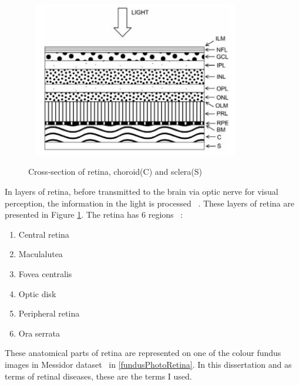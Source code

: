 \begin{figure}[t]
\caption{Cross-section of retina, choroid(C) and sclera(S)}~\cite{falt2012modern}
\label{layersOfRetina}
\centering
\includegraphics[width=0.8\textwidth]{Figures/layers_of_retina}
\end{figure}


In layers of retina, before transmitted to the brain via optic nerve for visual perception, the information in the light is processed ~\cite{kauppi2010eye}. These layers of retina are presented in Figure \ref{layersOfRetina}. The retina has 6 regions ~\cite{forrester2015eye}:

\begin{enumerate}
    \item Central retina
    \item Maculalutea
    \item Fovea centralis
    \item Optic disk
    \item Peripheral retina
    \item Ora serrata
\end{enumerate}

These anatomical parts of retina are represented on one of the colour fundus images in Messidor dataset~\cite{mookiah2015application} in \ref{fundusPhotoRetina}. In this dissertation and as terms of retinal diseases, these are the terms I used. 

